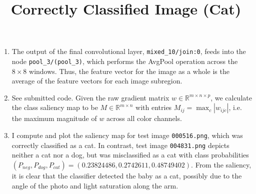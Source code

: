 \documentclass[12pt]{article}
\begin{document}
\begin{enumerate}
\begin{figure}[H]
	\end{figure}
	\item The output of the final convolutional layer, \verb|mixed_10/join:0|, feeds into the node \verb|pool_3/(pool_3)|, which performs the AvgPool operation across the $8 \times 8$ windows. Thus, the feature vector for the image as a whole is the average of the feature vectors for each image subregion.
	\item See submitted code. Given the raw gradient matrix $w \in \mathbb{R}^{m \times n \times p}$, we calculate the class saliency map to be $M \in \mathbb{R}^{m \times n}$ with entries $M_{ij} = \max_c |w_{ijc}|$, i.e. the maximum magnitude of $w$ across all color channels.
	\item I compute and plot the saliency map for test image \verb|000516.png|, which was correctly classified as a cat. In contrast, test image \verb|004831.png| depicts neither a cat nor a dog, but was misclassified as a cat with class probabilities $(P_{neg}, P_{dog}, P_{cat}) = (0.23824486, 0.2742611, 0.48749402)$. From the saliency, it is clear that the classifier detected the baby as a cat, possibly due to the angle of the photo and light saturation along the arm.
	\begin{figure}[H]
		\centering
		\title{\bf Correctly Classified Image (Cat)}
		\\ \vspace{2.5mm}

\end{figure}
\end{enumerate}
\end{document}
